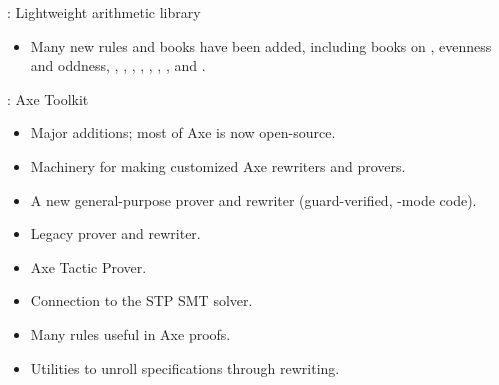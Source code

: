\begin{frame}

\implibtitle

: Lightweight arithmetic library

\begin{itemize}

\item Many new rules and books have been added, including books on
 , evenness and oddness,
, , , , ,
\code{<=}, , and .

\end{itemize}

\end{frame}


\begin{frame}

\implibtitle

: Axe Toolkit

\begin{itemize}

\item Major additions; most of Axe is now open-source.

\item Machinery for making customized Axe rewriters and provers.

\item A new general-purpose prover and rewriter (guard-verified, -mode code).

\item Legacy prover and rewriter.

\item Axe Tactic Prover.

\item Connection to the STP SMT solver.

\item Many rules useful in Axe proofs.

\item Utilities to unroll specifications through rewriting.

\end{itemize}

\end{frame}



